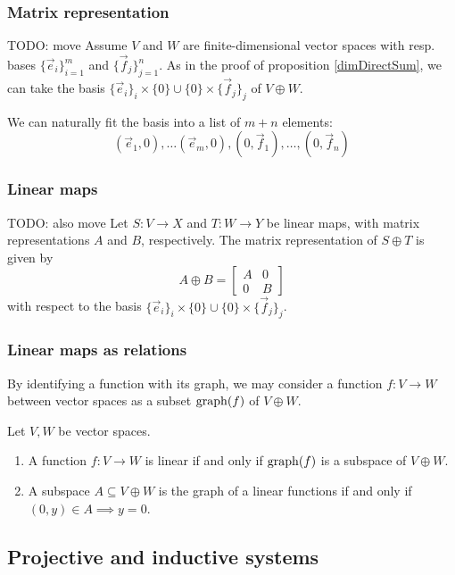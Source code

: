 \subsubsection{Matrix representation}
TODO: move
Assume $V$ and $W$ are finite-dimensional vector spaces with resp. bases $\{\vec{e}_i\}_{i=1}^m$ and $\{\vec{f}_j\}_{j=1}^n$.
As in the proof of proposition \ref{dimDirectSum}, we can take the basis $\{\vec{e}_i\}_i\times\{0\} \cup \{0\}\times\{\vec{f}_j\}_j$ of $V\oplus W$.

We can naturally fit the basis into a list of $m+n$ elements:
\[ (\vec{e}_1,0),\ldots (\vec{e}_m, 0), (0, \vec{f}_1), \ldots, (0,\vec{f}_n)  \]
\subsubsection{Linear maps}
TODO: also move
Let $S: V\to X$ and $T:W\to Y$ be linear maps, with matrix representations $A$ and $B$, respectively. The matrix representation of $S\oplus T$ is given by
\[ A\oplus B = \begin{bmatrix}
A & 0 \\
0 & B
\end{bmatrix} \]
with respect to the basis $\{\vec{e}_i\}_i\times\{0\} \cup \{0\}\times\{\vec{f}_j\}_j$.

\subsubsection{Linear maps as relations}
By identifying a function with its graph, we may consider a function $f: V\to W$ between vector spaces as a subset $\operatorname{graph}(f)$ of $V\oplus W$.

\begin{proposition}
Let $V,W$ be vector spaces.
\begin{enumerate}
\item A function $f: V\to W$ is linear \textup{if and only if} $\operatorname{graph}(f)$ is a subspace of $V\oplus W$.
\item A subspace $A\subseteq V\oplus W$ is the graph of a linear functions \textup{if and only if} $(0,y)\in A \implies y=0$.
\end{enumerate}
\end{proposition}

\subsection{Projective and inductive systems}
